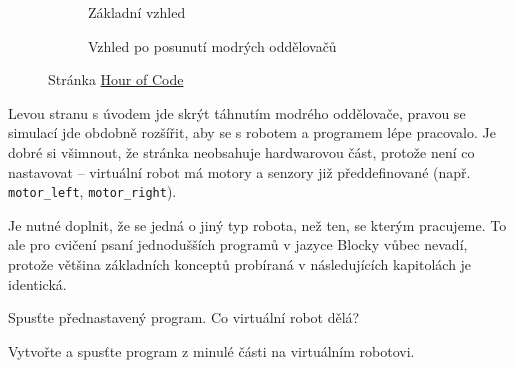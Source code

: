 \documentclass[../main.tex]{subfiles}
\begin{document}
	\begin{figure}[h!]%
		\begin{subfigure}{.49\textwidth}%
			\centering%
			\caption{Základní vzhled}%
		\end{subfigure} \hspace{.05\textwidth}%
		\begin{subfigure}{.49\textwidth}%
			\centering%
			\caption{Vzhled po posunutí modrých oddělovačů}%
		\end{subfigure}%
		\caption{Stránka \href{http://www.robotmesh.com/create/176384}{Hour of Code}}
	\end{figure}

	Levou stranu s úvodem jde skrýt táhnutím modrého oddělovače, pravou se simulací jde obdobně rozšířit, aby se s robotem a programem lépe pracovalo. Je dobré si všimnout, že stránka neobsahuje hardwarovou část, protože není co nastavovat -- virtuální robot má motory a senzory již předdefinované (např. \texttt{motor\_left}, \texttt{motor\_right}).

	Je nutné doplnit, že se jedná o jiný typ robota, než ten, se kterým pracujeme. To ale pro cvičení psaní jednodušších programů v jazyce Blocky vůbec nevadí, protože většina základních konceptů probíraná v následujících kapitolách je identická.

	\begin{question}
		Spusťte přednastavený program. Co virtuální robot dělá?
	\end{question}

	\begin{question}
		Vytvořte a spusťte program z minulé části na virtuálním robotovi.
	\end{question}
\end{document}
